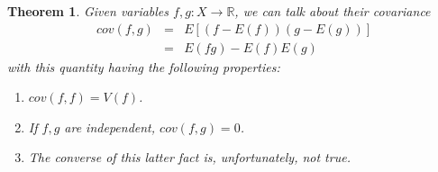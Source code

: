\documentclass[12pt]{amsbook}
\newtheorem{theorem}{Theorem}[chapter]
\begin{document}
\begin{theorem}
Given variables $f,g:X\to\mathbb R$, we can talk about their covariance
\begin{eqnarray*}
cov(f,g)
&=&E[(f-E(f))(g-E(g))]\\
&=&E(fg)-E(f)E(g)
\end{eqnarray*}
with this quantity having the following properties:
\begin{enumerate}
\item $cov(f,f)=V(f)$.

\item If $f,g$ are independent, $cov(f,g)=0$.

\item The converse of this latter fact is, unfortunately, not true.
\end{enumerate}
\end{theorem}
\end{document}
